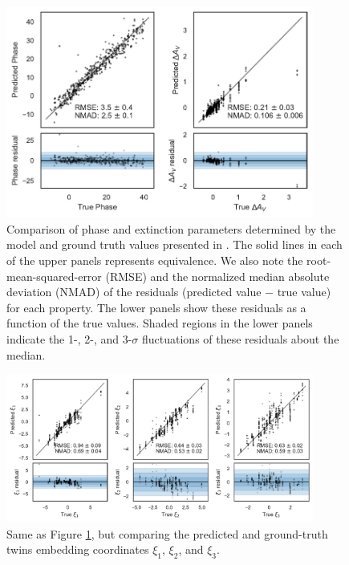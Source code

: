 \begin{figure}
    \centering
    \includegraphics[width=0.9\textwidth]{figures/nn_twins/scatter_spec2embed_phase_color.pdf}
    \caption{Comparison of phase and extinction parameters determined by the \stoe{} model and ground truth values presented in . The solid lines in each of the upper panels represents equivalence. We also note the root-mean-squared-error (RMSE) and the normalized median absolute deviation (NMAD) of the residuals (predicted value $-$ true value) for each property. The lower panels show these residuals as a function of the true values. Shaded regions in the lower panels indicate the 1-, 2-, and 3-$\sigma$ fluctuations of these residuals about the median.}
    \label{fig:scatter_spec2embed_phase_color}
\end{figure}

\begin{figure}
    \centering
    \includegraphics[width=0.9\textwidth]{figures/nn_twins/scatter_spec2embed_coords.pdf}
    \caption{Same as Figure \ref{fig:scatter_spec2embed_phase_color}, but comparing the predicted and ground-truth twins embedding coordinates $\xi_1$, $\xi_2$, and $\xi_3$.}
    \label{fig:scatter_spec2embed_coords}
\end{figure}

